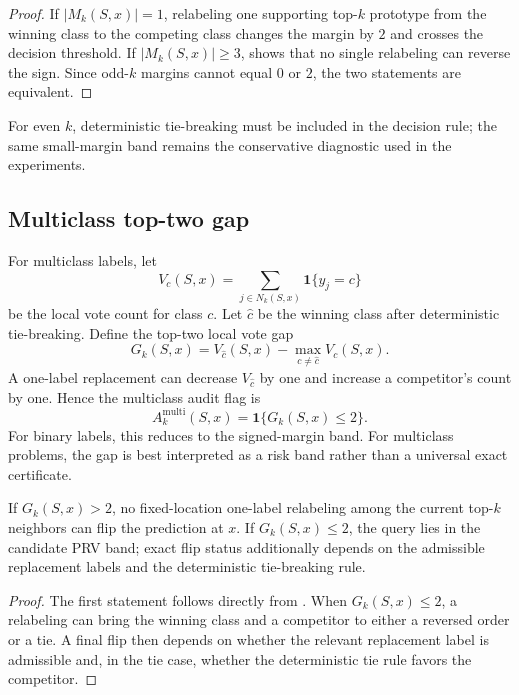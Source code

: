 \begin{proof}
If $|M_k(S,x)|=1$, relabeling one supporting top-$k$ prototype from the winning class to the competing class changes the margin by $2$ and crosses the decision threshold.  If $|M_k(S,x)|\ge 3$,  shows that no single relabeling can reverse the sign.  Since odd-$k$ margins cannot equal $0$ or $2$, the two statements are equivalent.
\end{proof}

For even $k$, deterministic tie-breaking must be included in the decision rule; the same small-margin band remains the conservative diagnostic used in the experiments.

\subsection{Multiclass top-two gap}

For multiclass labels, let
\[
    V_c(S,x)=\sum_{j\in N_k(S,x)}\mathbf 1\{y_j=c\}
\]
be the local vote count for class $c$.  Let $\hat c$ be the winning class after deterministic tie-breaking.  Define the top-two local vote gap
\[
    G_k(S,x)=V_{\hat c}(S,x)-\max_{c\ne \hat c}V_c(S,x).
\]
A one-label replacement can decrease $V_{\hat c}$ by one and increase a competitor's count by one.  Hence the multiclass audit flag is
\[
    A_k^{\mathrm{multi}}(S,x)=\mathbf 1\{G_k(S,x)\le 2\}.
\]
For binary labels, this reduces to the signed-margin band.  For multiclass problems, the gap is best interpreted as a risk band rather than a universal exact certificate.

\begin{proposition}
\label{prop:multiclass-band}
If $G_k(S,x)>2$, no fixed-location one-label relabeling among the current top-$k$ neighbors can flip the prediction at $x$.  If $G_k(S,x)\le 2$, the query lies in the candidate PRV band; exact flip status additionally depends on the admissible replacement labels and the deterministic tie-breaking rule.
\end{proposition}

\begin{proof}
The first statement follows directly from .  When $G_k(S,x)\le 2$, a relabeling can bring the winning class and a competitor to either a reversed order or a tie.  A final flip then depends on whether the relevant replacement label is admissible and, in the tie case, whether the deterministic tie rule favors the competitor.
\end{proof}

